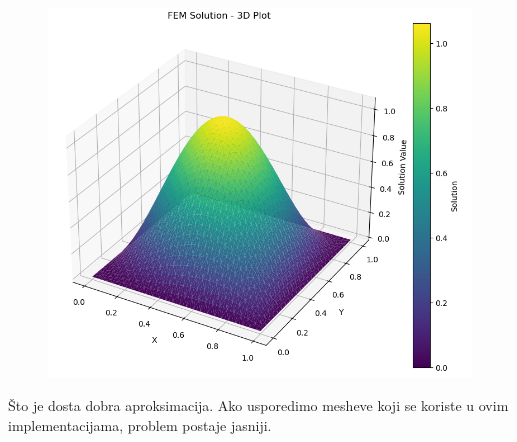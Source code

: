 \documentclass[zavrsnirad]{../fer}
\begin{document}
\begin{figure}[H]
	\centering
	\includegraphics[width=0.7\linewidth]{Figures/numersinsin.png}
	\caption{}
  \label{numerSinSin}
\end{figure}
Što je dosta dobra aproksimacija.
Ako usporedimo mesheve koji se koriste u ovim implementacijama,
problem postaje jasniji.
\end{document}
